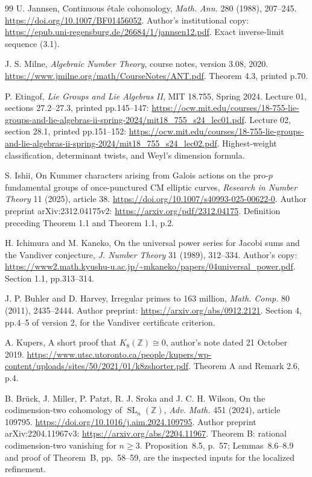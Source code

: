 \documentclass[11pt,a4paper]{article}
\theoremstyle{definition}
\begin{document}
\begin{thebibliography}{99}
U. Jannsen, Continuous \'etale cohomology,
\emph{Math. Ann.} 280 (1988), 207--245.
\url{https://doi.org/10.1007/BF01456052}.
Author's institutional copy:
\url{https://epub.uni-regensburg.de/26684/1/jannsen12.pdf}.
Exact inverse-limit sequence (3.1).


J. S. Milne, \emph{Algebraic Number Theory},
course notes, version 3.08, 2020.
\url{https://www.jmilne.org/math/CourseNotes/ANT.pdf}.
Theorem 4.3, printed p.70.


P. Etingof, \emph{Lie Groups and Lie Algebras II},
MIT 18.755, Spring 2024.
Lecture 01, sections 27.2--27.3, printed pp.145--147:
\url{https://ocw.mit.edu/courses/18-755-lie-groups-and-lie-algebras-ii-spring-2024/mit18_755_s24_lec01.pdf}.
Lecture 02, section 28.1, printed pp.151--152:
\url{https://ocw.mit.edu/courses/18-755-lie-groups-and-lie-algebras-ii-spring-2024/mit18_755_s24_lec02.pdf}.
Highest-weight classification, determinant twists, and Weyl's dimension formula.


S. Ishii,
On Kummer characters arising from Galois actions on the pro-\(p\)
fundamental groups of once-punctured CM elliptic curves,
\emph{Research in Number Theory} 11 (2025), article 38.
\url{https://doi.org/10.1007/s40993-025-00622-0}.
Author preprint arXiv:2312.04175v2:
\url{https://arxiv.org/pdf/2312.04175}.
Definition preceding Theorem 1.1 and Theorem 1.1, p.2.


H. Ichimura and M. Kaneko,
On the universal power series for Jacobi sums and the Vandiver conjecture,
\emph{J. Number Theory} 31 (1989), 312--334.
Author's copy:
\url{https://www2.math.kyushu-u.ac.jp/~mkaneko/papers/04universal_power.pdf}.
Section 1.1, pp.313--314.


J. P. Buhler and D. Harvey,
Irregular primes to 163 million,
\emph{Math. Comp.} 80 (2011), 2435--2444.
Author preprint:
\url{https://arxiv.org/abs/0912.2121}.
Section 4, pp.4--5 of version 2, for the Vandiver certificate criterion.


A. Kupers, A short proof that \(K_8(\mathbb Z)\cong0\),
author's note dated 21 October 2019.
\url{https://www.utsc.utoronto.ca/people/kupers/wp-content/uploads/sites/50/2021/01/k8zshorter.pdf}.
Theorem A and Remark 2.6, p.4.


B. Br\"uck, J. Miller, P. Patzt, R. J. Sroka and J. C. H. Wilson,
On the codimension-two cohomology of \(\operatorname{SL}_n(\mathbb Z)\),
\emph{Adv. Math.} 451 (2024), article 109795.
\url{https://doi.org/10.1016/j.aim.2024.109795}.
Author preprint arXiv:2204.11967v3:
\url{https://arxiv.org/abs/2204.11967}.
Theorem B: rational codimension-two vanishing for \(n\ge3\).
Proposition~8.5, p.~57; Lemmas~8.6--8.9 and proof of Theorem~B,
pp.~58--59, are the inspected inputs for the localized refinement.


\end{thebibliography}
\end{document}
